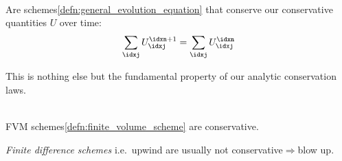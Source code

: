 \begin{defnbox}\nospacing
    \begin{defn}\label{defn:conservative_schemes}\leavevmode\\
        Are schemes\cref{defn:general_evolution_equation} that conserve our conservative quantities $U$ over time:
        \begin{align}
          \sum_{\idxj}U_{\idxj}^{\idxn+1}=\sum_{\idxj}U_{\idxj}^{\idxn}
        \end{align}
    \end{defn}
\end{defnbox}
\begin{explanationbox}\nospacing
  \begin{explanation}
    This is nothing else but the fundamental property of our analytic conservation laws.
  \end{explanation}
\end{explanationbox}
\begin{corbox}\nospacing
    \begin{cor}\label{cor:fvs_are_conservative}\leavevmode\\
        FVM schemes\cref{defn:finite_volume_scheme} are conservative.
    \end{cor}
\end{corbox}
\begin{notebox}[Note]\nospacing
    \textit{Finite difference schemes} i.e.\ upwind are usually not conservative$\Rightarrow$blow up.
\end{notebox}

